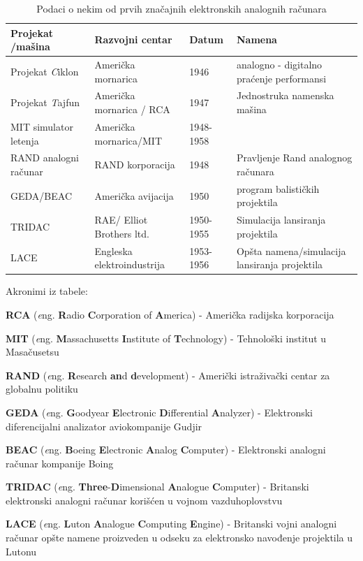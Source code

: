 \documentclass[a4paper]{article}
\begin{document}
	\begin{table}[h!]
		\begin{threeparttable}
			\caption{Podaci o nekim od prvih značajnih elektronskih analognih računara}
			\begin{tabular}{| m{2cm} | m{4cm} | m{1cm} | m{4cm} |}
				\hline
				\textbf{Projekat /mašina} & \textbf{Razvojni centar} & \textbf{Datum} & \textbf{Namena} \\
				\hline
				Projekat \emph Ciklon & Američka mornarica & 1946 & analogno - digitalno praćenje performansi \\
				\hline
				Projekat \emph Tajfun & Američka mornarica / RCA & 1947 & Jednostruka namenska mašina \\
				\hline
				MIT simulator letenja & Američka mornarica/MIT & 1948- 1958 & \\
				\hline
				RAND analogni računar & RAND korporacija & 1948 & Pravljenje Rand analognog računara \\
				\hline
				GEDA/BEAC &  Američka avijacija & 1950 & program balističkih projektila \\
				\hline
				TRIDAC & RAE/ Elliot Brothers ltd. & 1950- 1955 & Simulacija lansiranja projektila \\
				\hline
				LACE & Engleska elektroindustrija & 1953- 1956 & Opšta namena/simulacija lansiranja projektila \\ 
				\hline
			\end{tabular}
			\label{tab:tableEAR}
			\begin{tablenotes}
				\small
				\item Akronimi iz tabele:
				\item \textbf{RCA} (\textit eng. \textbf Radio \textbf Corporation of \textbf America) - Američka radijska korporacija
				\item \textbf{MIT} (\textit eng. \textbf Massachusetts \textbf Institute of \textbf Technology) - Tehnološki institut u Masačusetsu
				\item \textbf{RAND} (\textit eng. \textbf Research \textbf{an}d \textbf development) - Američki istraživački centar za globalnu politiku
				\item \textbf{GEDA} (\textit eng. \textbf Goodyear \textbf Electronic \textbf Differential \textbf Analyzer) - Elektronski diferencijalni analizator aviokompanije Gudjir
				\item \textbf{BEAC} (\textit eng. \textbf Boeing \textbf Electronic \textbf Analog \textbf Computer) - Elektronski analogni računar kompanije Boing
				\item \textbf{TRIDAC} (\textit eng. \textbf {Three}-\textbf Dimensional \textbf Analogue \textbf Computer) - Britanski elektronski analogni računar korišćen u vojnom vazduhoplovstvu
				\item \textbf{LACE} (\textit eng. \textbf Luton \textbf Analogue \textbf Computing \textbf Engine) - Britanski vojni analogni računar opšte namene proizveden u odseku za elektronsko navođenje projektila u Lutonu 
			\end{tablenotes}
		\end{threeparttable}
	\end{table}
\end{document}
